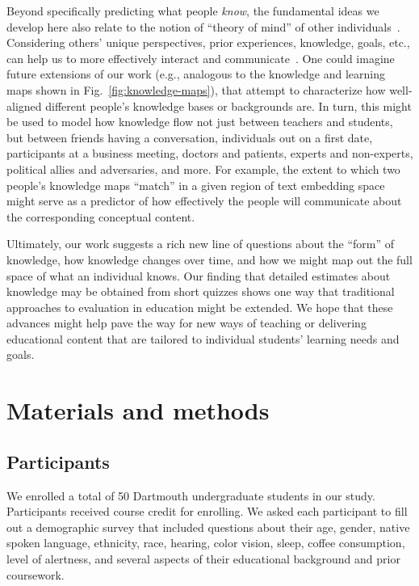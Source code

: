 \documentclass[10pt]{article}
\begin{document}
Beyond specifically predicting what people \textit{know}, the fundamental ideas
we develop here also relate to the notion of ``theory of mind'' of other
individuals~\citep{GoldWinn12, KansEtal15, Melt11}. Considering others' unique
perspectives, prior experiences, knowledge, goals, etc., can help us to more
effectively interact and communicate~\citep{ShaoEtal18, StepBaer06, Ratk18}.
One could imagine future extensions of our work (e.g., analogous to the
knowledge and learning maps shown in Fig.~\ref{fig:knowledge-maps}), that
attempt to characterize how well-aligned different people's knowledge bases or
backgrounds are. In turn, this might be used to model how knowledge flow not
just between teachers and students, but between friends having a conversation,
individuals out on a first date, participants at a business meeting, doctors
and patients, experts and non-experts, political allies and adversaries, and
more. For example, the extent to which two people's knowledge maps ``match'' in
a given region of text embedding space might serve as a predictor of how
effectively the people will communicate about the corresponding conceptual
content.

Ultimately, our work suggests a rich new line of questions about the ``form''
of knowledge, how knowledge changes over time, and how we might map out the
full space of what an individual knows. Our finding that detailed estimates
about knowledge may be obtained from short quizzes shows one way that
traditional approaches to evaluation in education might be extended. We hope
that these advances might help pave the way for new ways of teaching or
delivering educational content that are tailored to individual students'
learning needs and goals.

\section*{Materials and methods}

\subsection*{Participants}

We enrolled a total of 50 Dartmouth undergraduate students in our study.
Participants received course credit for enrolling. We asked each participant to
fill out a demographic survey that included questions about their age, gender,
native spoken language, ethnicity, race, hearing, color vision, sleep, coffee
consumption, level of alertness, and several aspects of their educational
background and prior coursework.
\end{document}
